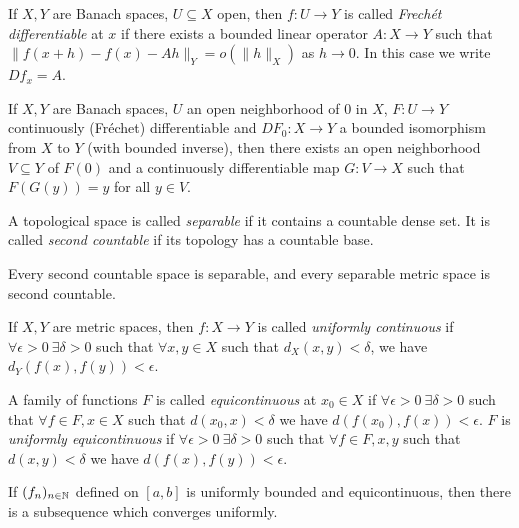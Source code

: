 \documentclass[letterpaper,11pt]{report}
\begin{document}
\begin{defn} If $X,Y$ are Banach spaces, $U \subseteq X$ open, then $f:U\rightarrow Y$ is called \emph{Frech\'et differentiable} at $x$ if there exists a bounded linear operator $A:X\rightarrow Y$ such that $\|f(x+h) - f(x) - Ah\|_Y = o(\|h\|_X)$ as $h \rightarrow 0$. In this case we write $Df_x = A$.
\end{defn}

\begin{cor} If $X,Y$ are Banach spaces, $U$ an open neighborhood of $0$ in $X$, $F:U\rightarrow Y$ continuously (Fr\'echet) differentiable and $DF_0:X\rightarrow Y$ a bounded isomorphism from $X$ to $Y$ (with bounded inverse), then there exists an open neighborhood $V \subseteq Y$ of $F(0)$ and a continuously differentiable map $G:V\rightarrow X$ such that $F(G(y)) = y$ for all $y \in V$.
\end{cor}

\begin{defn} A topological space is called \emph{separable} if it contains a countable dense set. It is called \emph{second countable} if its topology has a countable base.
\end{defn}

\begin{prop} Every second countable space is separable, and every separable metric space is second countable.
\end{prop}

\begin{defn} If $X,Y$ are metric spaces, then $f:X \rightarrow Y$ is called \emph{uniformly continuous} if $\forall \epsilon > 0\ \exists \delta > 0$ such that $\forall x,y \in X$ such that $d_X(x,y) < \delta$, we have $d_Y(f(x),f(y)) < \epsilon$.
\end{defn}

\begin{defn} A family of functions $F$ is called \emph{equicontinuous} at $x_0 \in X$ if $\forall \epsilon > 0\ \exists \delta > 0$ such that $\forall f \in F, x \in X$ such that $d(x_0,x) < \delta$ we have $d(f(x_0),f(x)) < \epsilon$. $F$ is \emph{uniformly equicontinuous} if $\forall \epsilon > 0\ \exists \delta > 0$ such that $\forall f \in F, x,y$ such that $d(x,y) < \delta$ we have $d(f(x),f(y)) < \epsilon$.
\end{defn}

\begin{thm} If $(f_n)_{n \in \mathbb{N}}$ defined on $[a,b]$ is uniformly bounded and equicontinuous, then there is a subsequence which converges uniformly.
\end{thm}
\end{document}
